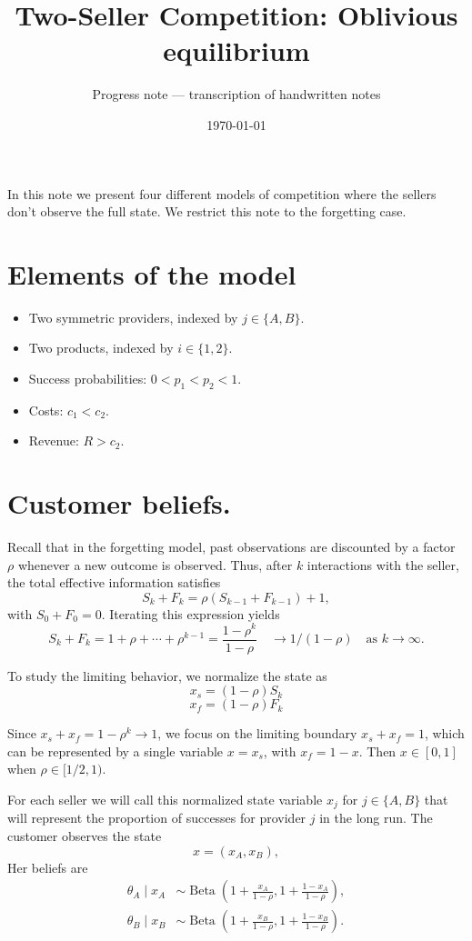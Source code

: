 \documentclass[11pt]{article}
\title{Two-Seller Competition: Oblivious equilibrium}
\author{Progress note --- transcription of handwritten notes}
\date{\today}
\DeclareMathOperator{\Beta}{Beta}
\begin{document}
\maketitle
In this note we present four different models of competition where the sellers don't observe the full state. We restrict this note to the forgetting case. 

\section{Elements of the model}

\begin{itemize}
\item Two symmetric providers, indexed by $j\in\{A,B\}$.
\item Two products, indexed by $i\in\{1,2\}$.
\item Success probabilities: $0<p_1<p_2<1$.
\item Costs: $c_1<c_2$.
\item Revenue: $R>c_2$.
\end{itemize}

\section{Customer beliefs.}
Recall that in the forgetting model, past observations are discounted by a factor $\rho$ whenever a new outcome is observed. Thus, after $k$ interactions with the seller, the total effective information satisfies
$$
S_k+F_k=\rho(S_{k-1}+F_{k-1})+1,
$$
with \(S_0+F_0=0\). Iterating this expression yields
$$
S_k+F_k=1+\rho+\cdots+\rho^{k-1}
=\frac{1-\rho^k}{1-\rho} \quad \to 1/(1-\rho)\quad\text{as }k\to\infty.
$$

To study the limiting behavior, we normalize the state as 
$$x_s=(1-\rho)S_k$$ 
$$x_f=(1-\rho)F_k$$

Since $x_s+x_f=1-\rho^k\to1$, we focus on the limiting boundary $x_s+x_f=1$, which can be represented by a single variable $x=x_s$, with $x_f=1-x$. Then $x\in [0,1]$ when $\rho \in [1/2,1)$. 

For each seller we will call this normalized state variable $x_j$ for $j\in\{A,B\}$ that will represent the proportion of successes for provider $j$ in the long run. The customer observes the state
$$
x=(x_A,x_B),
$$
Her beliefs are
\begin{align}
\theta_A\mid x_A&\sim\Beta(1+\frac{x_A}{1-\rho},1+\frac{1-x_A}{1-\rho}),\\
\theta_B\mid x_B&\sim\Beta(1+\frac{x_B}{1-\rho},1+\frac{1-x_B}{1-\rho}).
\end{align}
\end{document}
